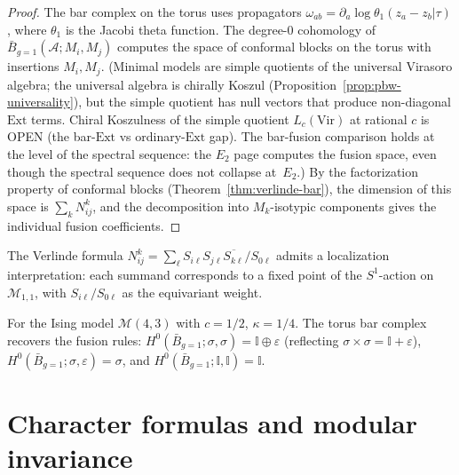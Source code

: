 \begin{proof}
The bar complex on the torus uses propagators
$\omega_{ab} = \partial_a \log \theta_1(z_a - z_b | \tau)$,
where $\theta_1$ is the Jacobi theta function.
The degree-0 cohomology of $\bar{B}_{g=1}(\mathcal{A}; M_i, M_j)$
computes the space of conformal blocks on the torus with insertions
$M_i, M_j$. (Minimal models are simple quotients of the universal Virasoro
algebra; the universal algebra is chirally Koszul
\textup{(}Proposition~\textup{\ref{prop:pbw-universality}}\textup{)},
but the simple quotient has null vectors that produce
non-diagonal $\mathrm{Ext}$ terms. Chiral Koszulness of the
simple quotient $L_c(\mathrm{Vir})$ at rational $c$ is OPEN
\textup{(}the bar-$\mathrm{Ext}$ vs ordinary-$\mathrm{Ext}$ gap\textup{)}.
The bar-fusion comparison holds at the
level of the spectral sequence: the $E_2$ page computes the
fusion space, even though the spectral sequence does not
collapse at~$E_2$.)
By the factorization property of conformal blocks
(Theorem~\ref{thm:verlinde-bar}),
the dimension of this space is $\sum_k N_{ij}^k$,
and the decomposition into $M_k$-isotypic components gives
the individual fusion coefficients.
\end{proof}

\begin{remark}
\label{rem:verlinde-euler}
The Verlinde formula $N_{ij}^k = \sum_\ell S_{i\ell}S_{j\ell}\overline{S_{k\ell}}/S_{0\ell}$ admits a localization interpretation: each summand corresponds to a fixed point of the $S^1$-action on $\mathcal{M}_{1,1}$, with $S_{i\ell}/S_{0\ell}$ as the equivariant weight.
\end{remark}

\begin{computation}
\label{comp:ising-bar-interpretation}
For the Ising model $\mathcal{M}(4,3)$ with $c = 1/2$, $\kappa = 1/4$. The torus bar complex recovers the fusion rules: $H^0(\bar{B}_{g=1}; \sigma, \sigma) = \mathbb{I} \oplus \varepsilon$ (reflecting $\sigma \times \sigma = \mathbb{I} + \varepsilon$), $H^0(\bar{B}_{g=1}; \sigma, \varepsilon) = \sigma$, and $H^0(\bar{B}_{g=1}; \mathbb{I}, \mathbb{I}) = \mathbb{I}$.
\end{computation}


\section{Character formulas and modular invariance}
\label{sec:character-modular}

